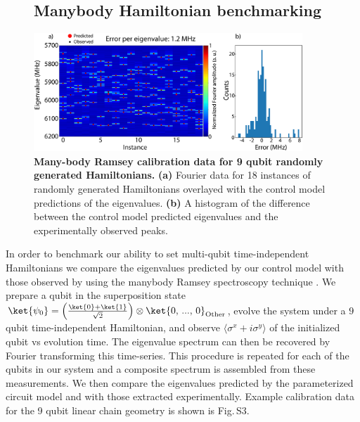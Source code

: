 \begin{figure}
    \subsection{Manybody Hamiltonian benchmarking}
    \centering
    \includegraphics[width=0.9\textwidth, keepaspectratio]{./PDF/random_hamiltonian_calibration_data_190508_549p.pdf}
    \caption{\textbf{Many-body Ramsey calibration data for 9 qubit randomly generated Hamiltonians.}
    \textbf{(a)} Fourier data for 18 instances of randomly generated Hamiltonians overlayed with the control model predictions of the eigenvalues.
    \textbf{(b)} A histogram of the difference between the control model predicted eigenvalues and the experimentally observed peaks.
    }\end{figure}
    In order to benchmark our ability to set multi-qubit time-independent Hamiltonians we compare the eigenvalues predicted by our control model with those observed by using the manybody Ramsey spectroscopy technique \autocite{Roushan2018}.
    We prepare a qubit in the superposition state
    $\ket{\psi_0} = \left( \frac{\ket{0} + \ket{1} }{\sqrt{2}} \right) \otimes \ket{ \text{0, ..., 0} }_{\text{Other}}$,
    evolve the system under a $9$ qubit time-independent Hamiltonian, and observe $\langle \sigma^x + i \sigma^y \rangle$ of the initialized qubit vs evolution time.
    The eigenvalue spectrum can then be recovered by Fourier transforming this time-series.
    This procedure is repeated for each of the qubits in our system and a composite spectrum is assembled from these measurements.
We then compare the eigenvalues predicted by the parameterized circuit model and with those extracted experimentally.  Example calibration data for the 9 qubit linear chain geometry is shown is Fig.\,S3.

